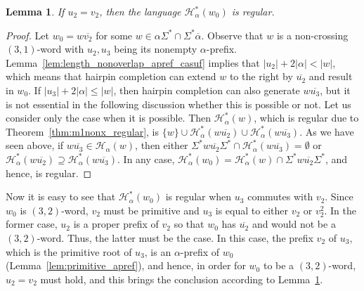 \documentclass{article}
\theoremstyle{plain}
\newtheorem{lemma}{Lemma}
\theoremstyle{remark}
\newcommand{\HC}{\ensuremath{\mathcal{H}}}
\newcommand{\calpha}{\ensuremath{\overline{\alpha}}}
\begin{document}
\begin{lemma}\label{lem:22nonx_u2isv2_regular}
	If $u_2 = v_2$, then the language $\HC_\alpha^*(w_0)$ is regular. 
\end{lemma}
\begin{proof}
	Let $w_0 = w \overline{v_2}$ for some $w \in \alpha \Sigma^* \cap \Sigma^* \calpha$. 
	Observe that $w$ is a non-crossing $(3, 1)$-word with $u_2, u_3$ being its nonempty $\alpha$-prefix. 
	Lemma~\ref{lem:length_nonoverlap_apref_casuf} implies that $|u_2| + 2|\alpha| < |w|$, which means that hairpin completion can extend $w$ to the right by $\overline{u_2}$ and result in $w_0$. 
	If $|u_3| + 2|\alpha| \le |w|$, then hairpin completion can also generate $w \overline{u_3}$, but it is not essential in the following discussion whether this is possible or not. 
	Let us consider only the case when it is possible. 
	Then $\HC_\alpha^*(w)$, which is regular due to Theorem~\ref{thm:m1nonx_regular}, is $\{w\} \cup \HC_\alpha^*(w\overline{u_2}) \cup \HC_\alpha^*(w\overline{u_3})$. 
	As we have seen above, if $w\overline{u_3} \in \HC_\alpha(w)$, then either $\Sigma^* w \overline{u_2} \Sigma^* \cap \HC_\alpha^*(w\overline{u_3}) = \emptyset$ or $\HC_\alpha^*(w\overline{u_2}) \supseteq \HC_\alpha^*(w\overline{u_3})$. 
	In any case, $\HC_\alpha^*(w_0) = \HC_\alpha^*(w) \cap \Sigma^* w \overline{u_2} \Sigma^*$, and hence, is regular. 
\end{proof}

Now it is easy to see that $\HC_\alpha^*(w_0)$ is regular when $u_3$ commutes with $v_2$. 
Since $w_0$ is $(3, 2)$-word, $v_2$ must be primitive and $u_3$ is equal to either $v_2$ or $v_2^2$. 
In the former case, $u_2$ is a proper prefix of $v_2$ so that $w_0$ has $\overline{u_2}$ and would not be a $(3, 2)$-word. 
Thus, the latter must be the case. 
In this case, the prefix $v_2$ of $u_3$, which is the primitive root of $u_3$, is an $\alpha$-prefix of $w_0$ (Lemma~\ref{lem:primitive_apref}), and hence, in order for $w_0$ to be a $(3, 2)$-word, $u_2 = v_2$ must hold, and this brings the conclusion according to Lemma~\ref{lem:22nonx_u2isv2_regular}. 
\end{document}
